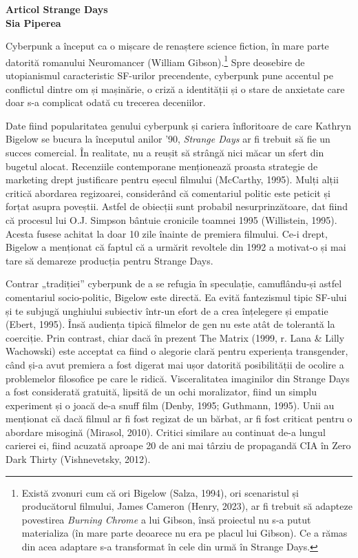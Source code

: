 \documentclass[a4paper, 12pt]{article}
\begin{document}
	
	
	\begin{center}
		{\fontsize{40}{48}\selectfont \bfseries Articol Strange Days} 
		\\\vspace{20pt}
		\vspace{10pt}
		\textbf{Sia Piperea}
	\end{center}
	
	
Cyberpunk a început ca o mișcare de renaștere science fiction, în mare parte datorită romanului Neuromancer (William Gibson).\footnote{Există zvonuri cum că ori Bigelow (Salza, 1994), ori scenaristul și producătorul filmului, James Cameron (Henry, 2023), ar fi trebuit să adapteze povestirea \textit{Burning Chrome} a lui Gibson, însă proiectul nu s-a putut materializa (în mare parte deoarece nu era pe placul lui Gibson). Ce a rămas din acea adaptare s-a transformat în cele din urmă în Strange Days.} Spre deosebire de utopianismul caracteristic SF-urilor precendente, cyberpunk pune accentul pe conflictul dintre om și mașinărie, o criză a identității și o stare de anxietate care doar s-a complicat odată cu trecerea deceniilor.\break

Date fiind popularitatea genului cyberpunk și cariera înfloritoare de care Kathryn Bigelow se bucura la începutul anilor '90, \textit{Strange Days} ar fi trebuit să fie un succes comercial. În realitate, nu a reușit să strângă nici măcar un sfert din bugetul alocat. Recenziile contemporane menționează proasta strategie de marketing drept justificare pentru eșecul filmului (McCarthy, 1995). Mulți alții critică abordarea regizoarei, considerând că comentariul politic este peticit și forțat asupra poveștii. Astfel de obiecții sunt probabil nesurprinzătoare, dat fiind că procesul lui O.J. Simpson bântuie cronicile toamnei 1995 (Willistein, 1995). Acesta fusese achitat la doar 10 zile înainte de premiera filmului. Ce-i drept, Bigelow a menționat că faptul că a urmărit revoltele din 1992 a motivat-o și mai tare să demareze producția pentru Strange Days.\break

Contrar „tradiției” cyberpunk de a se refugia în speculație, camuflându-și astfel comentariul socio-politic, Bigelow este directă. Ea evită fantezismul tipic SF-ului și te subjugă unghiului subiectiv într-un efort de a crea înțelegere și empatie (Ebert, 1995). Însă audiența tipică filmelor de gen nu este atât de tolerantă la coerciție. Prin contrast, chiar dacă în prezent The Matrix (1999, r. Lana & Lilly Wachowski) este acceptat ca fiind o alegorie clară pentru experiența transgender, când și-a avut premiera a fost digerat mai ușor datorită posibilității de ocolire a problemelor filosofice pe care le ridică. Visceralitatea imaginilor din Strange Days a fost considerată gratuită, lipsită de un ochi moralizator, fiind un simplu experiment și o joacă de-a snuff film (Denby, 1995; Guthmann, 1995). Unii au menționat că dacă filmul ar fi fost regizat de un bărbat, ar fi fost criticat pentru o abordare misogină (Mirasol, 2010). Critici similare au continuat de-a lungul carierei ei, fiind acuzată aproape 20 de ani mai târziu de propagandă CIA în Zero Dark Thirty (Vishnevetsky, 2012).\break
\end{document}
